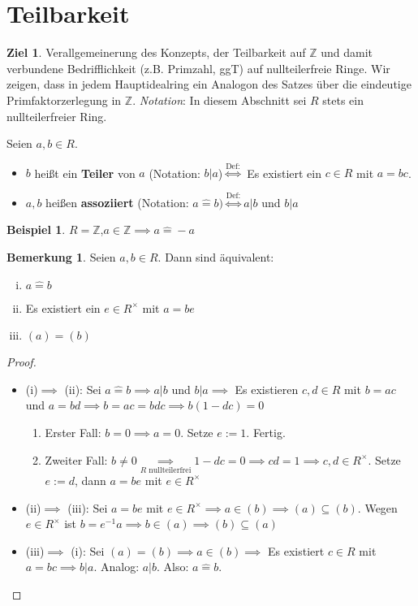 \documentclass[a4paper, titlepage]{article}
\theoremstyle{definition}
\newtheorem{bsp}[satz]{Beispiel}
\newtheorem{bem}[satz]{Bemerkung}
\newtheorem*{ziel}{Ziel}
\newcommand{\Z}{\mathbb{Z}}
\begin{document}
\section{Teilbarkeit}
\begin{ziel}
    Verallgemeinerung des Konzepts, der Teilbarkeit auf $\Z$ und damit verbundene Bedrifflichkeit (z.B. Primzahl, ggT) auf nullteilerfreie Ringe. Wir zeigen, dass in jedem Hauptidealring ein Analogon des Satzes über die eindeutige Primfaktorzerlegung in $\Z$. 
    \textit{Notation}: In diesem Abschnitt sei $R$ stets ein nullteilerfreier Ring.
\end{ziel}
\begin{definition}
    Seien $a,b\in R$.
    \begin{itemize}
    \item $b$ heißt ein \textbf{Teiler} von $a$ (Notation: $b|a$)$\overset{\text{Def:}}{\Leftrightarrow}$ Es existiert ein $c\in R $ mit $a=bc$.
    \item $a,b$ heißen \textbf{assoziiert} (Notation: $a\widehat= b)\overset{\text{Def:}}{\Leftrightarrow} a|b$ und $b|a$
    \end{itemize}
\end{definition}
\begin{bsp}
    $R=\Z$,$a\in\Z\implies a \widehat= -a$
\end{bsp}
\begin{bem}
    Seien $a,b\in R$. Dann sind äquivalent:
    \begin{enumerate}[(i)]
        \item $a \widehat=b$
        \item Es existiert ein $e\in R^{\times} $ mit $a=be$
        \item $(a)=(b)$
    \end{enumerate}
\end{bem}
\begin{proof}
\begin{itemize}
    \item (i)$\implies$ (ii): Sei $a\widehat=b\implies a|b$ und $b|a\implies $ Es existieren $c,d\in R$ mit $b=ac $ und $a=bd\implies b=ac =bdc\implies b(1-dc)=0$
    \begin{enumerate}
        \item Erster Fall: $b=0 \implies a=0$. Setze $e:=1$. Fertig.
        \item Zweiter Fall: $b\neq 0\underset{R\text{ nullteilerfrei}}{\implies} 1-dc=0\implies cd=1\implies c,d\in R^{\times}$. Setze $e:=d$, dann $a=be$ mit $e\in R^{\times}$
    \end{enumerate}
    \item (ii)$\implies$ (iii): Sei $a =be$ mit $e\in R^{\times} \implies a\in(b) \implies (a)\subseteq (b). $ Wegen $e\in R^{\times} $ ist $b =e^{-1}a\implies b\in (a) \implies (b)\subseteq (a)$
    \item (iii)$\implies$ (i): Sei $(a)=(b) \implies a\in (b) \implies $ Es existiert $c\in R$ mit $a=bc\implies b|a$. Analog: $a|b$. Also: $a\widehat=b$.
\end{itemize}
\end{proof}
\end{document}
